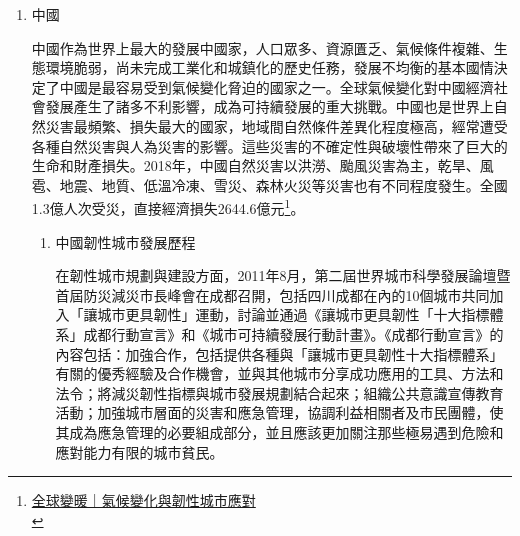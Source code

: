 \documentclass[a4paper,12pt]{article}
\begin{document}
\begin{enumerate}
\begin{enumerate}
位於加塞走廊.與埃及相隔一個西奈半島的以色列自立國以來，就因降水少沙漠多而缺乏淡水，但此危機卻發展出全球頂尖的水資源管理能力。以色列水務總局局長Giora Shaham說明，以色列八七○萬人口加上農工業，每年短缺二十一億立方的淡水，而氣候變遷使以色列乾旱越來越嚴重，同時可能伴隨水患。因此以色列在各地水源建立觀測模型，預測自然供水變化，每年二次委員會依據預測水量來討論各方用水的平衡\footnote{\href{https://www.cw.com.tw/article/5090081?from=search}{氣候變遷下的缺水挑戰，地球村的居民，你準備好了嗎？}\\\label{orgf51a076}}。\\

另一方面也設法將用水來源多元化，至2018年，以色列有五座回收廢水處理廠，重覆利用八十六\%的水，全國用水有一半由海水淡化與回收水而來，降低對自然供水的依賴。除了科技與設備，以色列同時在法規及組織管理、水質標準及財務規範上著力，結合經濟政策，建立更有效率的水資源管理\textsuperscript{\ref{orgf51a076}}。\\
\end{enumerate}
\item 中國
\label{sec:org670d164}

中國作為世界上最大的發展中國家，人口眾多、資源匱乏、氣候條件複雜、生態環境脆弱，尚未完成工業化和城鎮化的歷史任務，發展不均衡的基本國情決定了中國是最容易受到氣候變化脅迫的國家之一。全球氣候變化對中國經濟社會發展產生了諸多不利影響，成為可持續發展的重大挑戰。中國也是世界上自然災害最頻繁、損失最大的國家，地域間自然條件差異化程度極高，經常遭受各種自然災害與人為災害的影響。這些災害的不確定性與破壞性帶來了巨大的生命和財產損失。2018年，中國自然災害以洪澇、颱風災害為主，乾旱、風雹、地震、地質、低溫冷凍、雪災、森林火災等災害也有不同程度發生。全國1.3億人次受災，直接經濟損失2644.6億元\footnote{\href{http://m.tanpaifang.com/article/72587.html}{全球變暖｜氣候變化與韌性城市應對}\\\label{org402e1a8}}。\\

\begin{enumerate}
\item 中國韌性城市發展歷程
\label{sec:org2a3ed6f}

在韌性城市規劃與建設方面，2011年8月，第二屆世界城市科學發展論壇暨首屆防災減災市長峰會在成都召開，包括四川成都在內的10個城市共同加入「讓城市更具韌性」運動，討論並通過《讓城市更具韌性「十大指標體系」成都行動宣言》和《城市可持續發展行動計畫》。《成都行動宣言》的內容包括：加強合作，包括提供各種與「讓城市更具韌性十大指標體系」有關的優秀經驗及合作機會，並與其他城市分享成功應用的工具、方法和法令；將減災韌性指標與城市發展規劃結合起來；組織公共意識宣傳教育活動；加強城市層面的災害和應急管理，協調利益相關者及市民團體，使其成為應急管理的必要組成部分，並且應該更加關注那些極易遇到危險和應對能力有限的城市貧民。\\


\end{enumerate}
\end{enumerate}
\end{document}
